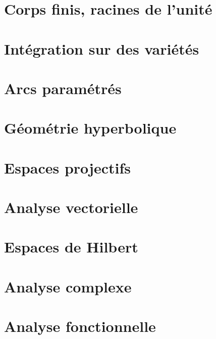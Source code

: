 \documentclass[a4paper,twoside,11pt]{book}
\begin{document}
\chapter{Corps finis, racines de l'unité}


\chapter{Intégration sur des variétés}







\chapter{Arcs paramétrés}




\chapter{Géométrie hyperbolique}


\chapter{Espaces projectifs}




\chapter{Analyse vectorielle}


\chapter{Espaces de Hilbert}


\chapter{Analyse complexe}          \label{ChapICHIooXbLccl}




\chapter{Analyse fonctionnelle}





\end{document}
